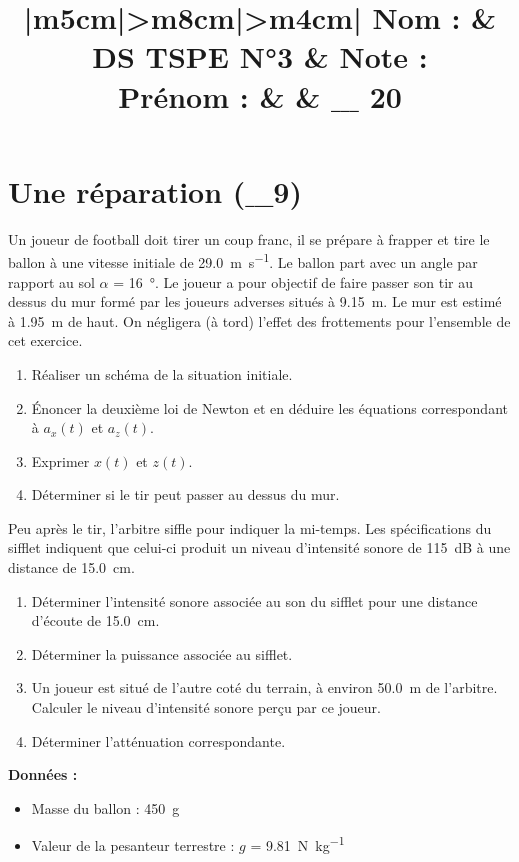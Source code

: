 \documentclass[a4paper,11pt,fleqn]{article}%
\title{\vspace{-1cm}\large 
	\begin{tabular}{|m{5cm}|>{\centering}m{8cm}|>{\centering\arraybackslash}m{4cm}|}
		\hline
		Nom : & \textbf{\textsc{DS TSPE N°3}} &  Note : \\
		Prénom : & & $\_\_\_$ \textbf{20} \\ \hline
\end{tabular}}
\date{}
\begin{document}
\maketitle
\vspace{-2.5cm}

\noindent \begin{minipage}[t]{.9\linewidth}
\section{ Une réparation  ($\_\_\_$9)}
Un joueur de football doit tirer un coup franc, il se prépare à frapper et tire le ballon à une vitesse initiale de \SI{29,0}{\meter\per\second}. Le ballon part avec un angle par rapport au sol $\alpha $ = \SI{16}{\degree}. Le joueur a pour objectif de faire passer son tir au dessus du mur formé par les joueurs adverses situés à \SI{9,15}{m}. Le mur est estimé à \SI{1,95}{m} de haut. On négligera (à tord) l'effet des frottements pour l'ensemble de cet exercice.

\begin{enumerate}
	\item Réaliser un schéma de la situation initiale.
	\item Énoncer la deuxième loi de Newton et en déduire les équations correspondant à $a_x(t)$ et $a_z(t)$.
	\item Exprimer $x(t)$ et $z(t)$.
	\item Déterminer si le tir peut passer au dessus du mur.
\end{enumerate}

Peu après le tir, l'arbitre siffle pour indiquer la mi-temps. Les spécifications du sifflet indiquent que celui-ci produit un niveau d'intensité sonore de \SI{115}{dB} à une distance de \SI{15,0}{cm}.
\begin{enumerate}[resume]
	\item Déterminer l'intensité sonore associée au son du sifflet pour une distance d'écoute de \SI{15,0}{cm}.
	\item Déterminer la puissance associée au sifflet.
	\item Un joueur est situé de l'autre coté du terrain, à environ \SI{50,0}{m} de l'arbitre. Calculer le niveau d'intensité sonore perçu par ce joueur.
	\item Déterminer l'atténuation correspondante.
\end{enumerate}

\textbf{Données :}
\begin{itemize}
	\item Masse du ballon  : \SI{450}{g}
	\item Valeur de la pesanteur terrestre : $g$ = \SI{9.81}{\newton\per\kilo\gram}
\end{itemize}
\end{minipage}
\end{document}
